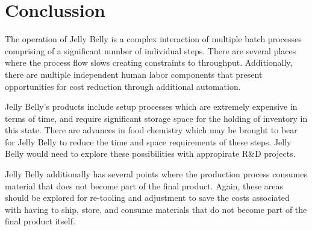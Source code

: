 \section{Conclussion}

The operation of Jelly Belly is a complex interaction of multiple batch processes comprising of a significant number of individual steps. There are several places where the process flow slows creating constraints to throughput. Additionally, there are multiple independent human labor components that present opportunities for cost reduction through additional automation.

Jelly Belly's products include setup processes which are extremely expensive in terms of time, and require significant storage space for the holding of inventory in this state. There are advances in food chemistry which may be brought to bear for Jelly Belly to reduce the time and space requirements of these steps. Jelly Belly would need to explore these possibilities with appropirate R\&D projects.

Jelly Belly additionally has several points where the production process consumes material that does not become part of the final product. Again, these areas should be explored for re-tooling and adjustment to save the costs associated with having to ship, store, and consume materials that do not become part of the final product itself.
